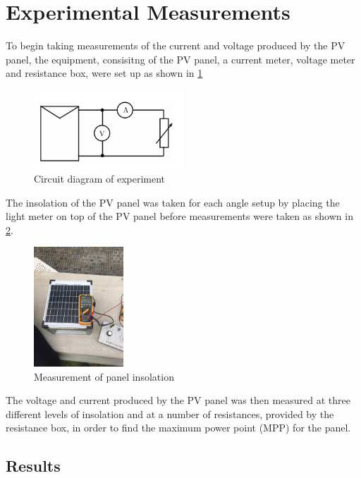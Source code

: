 \documentclass{article}
\begin{document}
	\section{Experimental Measurements}
		To begin taking measurements of the current and voltage produced by the PV panel, the equipment, consisitng of the PV panel, a current meter, voltage meter and resistance box, were set up as shown in \cref{fig:circuit}
		\begin{figure}[H]
			\centering
			\includegraphics[width=0.5\textwidth]{circuitdiagram}
			\caption{Circuit diagram of experiment}
			\label{fig:circuit}
		\end{figure}
		The insolation of the PV panel was taken for each angle setup by placing the light meter on top of the PV panel before measurements were taken as shown in \cref{fig:lux_reading}.
		\begin{figure}[H]
			\centering
			\includegraphics[width=0.3\textwidth]{lux_reading}
			\caption{Measurement of panel insolation}
			\label{fig:lux_reading}
		\end{figure}
		The voltage and current produced by the PV panel was then measured at three different levels of insolation and at a number of resistances, provided by the resistance box, in order to find the maximum power point (MPP) for the panel.
		
	\subsection{Results}\label{section:Results}
	
\end{document}
